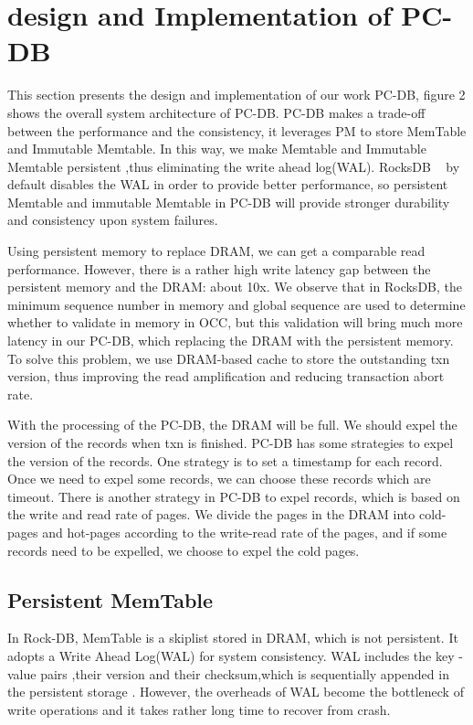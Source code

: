 \section{design and Implementation of PC-DB}
This section presents the design and implementation of our work PC-DB, figure 2 shows the overall system architecture of PC-DB. PC-DB makes a trade-off between the performance and the consistency, it leverages PM to  store MemTable and Immutable Memtable. In this way, we make Memtable and Immutable Memtable persistent ,thus eliminating the write ahead log(WAL). RocksDB ~\cite{RocksDB} by default disables the WAL in order to provide better performance, so persistent Memtable and immutable Memtable in PC-DB will provide stronger durability and consistency upon system failures.

Using persistent memory to replace DRAM, we can get a comparable read performance. However, there is a rather high write latency gap between the persistent memory and the DRAM: about 10x. We observe that in RocksDB, the minimum sequence number in memory and global sequence are used to determine whether to validate in memory in OCC, but this validation will bring much more latency in our PC-DB, which replacing the DRAM with the persistent memory. To solve this problem, we use DRAM-based cache to store the outstanding txn version, thus improving the read amplification and reducing transaction abort rate.

With the processing of the PC-DB, the DRAM will be full. We should expel the version of the records when txn is finished. PC-DB has some strategies to expel the version of the records. One strategy is to set a timestamp for each record. Once we need to expel some records, we can choose these records which are timeout. There is another strategy in PC-DB to expel records, which is based on the write and read rate of pages. We divide the pages in the DRAM into cold-pages and hot-pages according to the write-read rate of the pages, and if some records need to be expelled, we choose to expel the cold pages.

\subsection{Persistent MemTable}
In Rock-DB, MemTable is a skiplist stored in DRAM, which is not persistent. It adopts a Write Ahead Log(WAL) for system consistency. WAL includes the key -value pairs ,their version and their checksum,which is sequentially appended in the persistent storage . 
However, the overheads of WAL become the bottleneck of write operations and it takes rather long time to recover from crash. 


